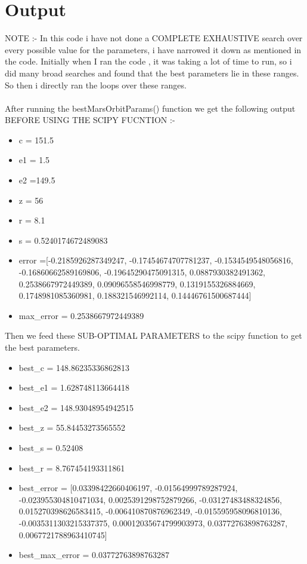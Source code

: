 \documentclass{article}
\begin{document}
\section{Output}
NOTE :- In this code i have not done a COMPLETE EXHAUSTIVE search over every possible value for the parameters, i have narrowed it down as mentioned in the code. Initially when I ran the code , it was taking a lot of time to run, so i did many broad searches and found that the best parameters lie in these ranges. So then i directly ran the loops over these ranges.\\
\vspace{3pt}
\\
After running the bestMarsOrbitParams() function we get the following output BEFORE USING THE SCIPY FUCNTION :-

\begin{itemize}
    \item c = 151.5
    \item e1 = 1.5
    \item e2 =149.5
    \item z = 56
    \item r = 8.1
    \item s = 0.5240174672489083
    \item error =[-0.2185926287349247, -0.17454674707781237, -0.1534549548056816, -0.16860662589169806, -0.19645290475091315, 0.0887930382491362, 0.2538667972449389, 0.09096558546998779, 0.1319155326884669, 0.1748981085360981, 0.188321546992114, 0.14446761500687444]

    \item max\_error = 0.2538667972449389

\end{itemize}

Then we feed these SUB-OPTIMAL PARAMETERS to the scipy function to get the best parameters.\\

\begin{itemize}
    \item best\_c = 148.86235336862813
    \item best\_e1 = 1.628748113664418
    \item best\_e2 = 148.93048954942515
    \item best\_z = 55.84453273565552
    \item best\_s = 0.52408
    \item best\_r = 8.767454193311861
    \item best\_error = [0.03398422660406197, -0.01564999789287924, -0.023955304810471034, 0.0025391298752879266, -0.03127483488324856, 0.015270398626583415, -0.006410870876962349, -0.015595958096810136, -0.0035311303215337375, 0.00012035674799903973, 0.03772763898763287, 0.0067721788963410745]

    \item best\_max\_error = 0.03772763898763287

\end{itemize}
\end{document}
